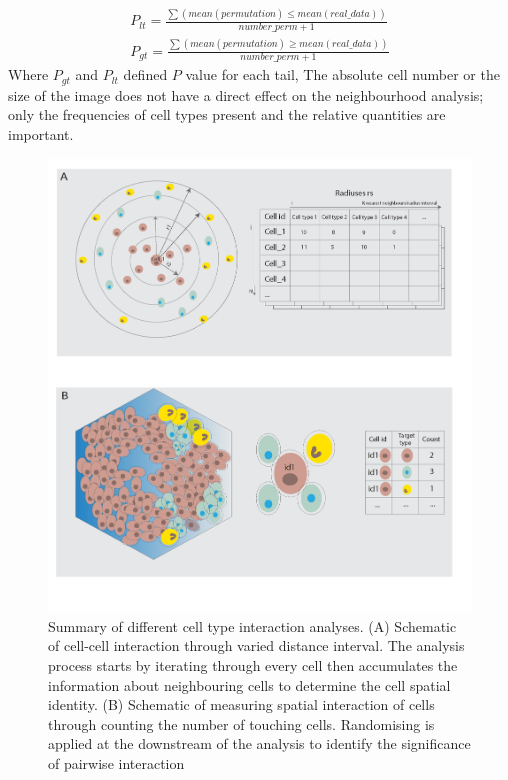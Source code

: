 \begin{equation}
\begin{split}
P_{lt} = \frac{ \sum(mean(permutation) \leq mean(real\_data) )}{number\_perm + 1} \\
P_{gt} = \frac{\sum(mean(permutation) \geq mean(real\_data) )}{number\_perm + 1}
\label{chap1:eq:02}
\end{split}
\end{equation}
Where $P_{gt}$ and $P_{lt}$ defined $P$ value for each tail, 
The absolute cell number or the size of the image does not have a direct effect on the neighbourhood analysis; only the frequencies of cell types present and the relative quantities are important. 
\begin{figure}
    \centering
    \includegraphics[width=0.85\columnwidth]{Chapter3/Figures/Conceptualise_CCC_analysis_cropped-01.png}
    \caption[Summary of different cell type interaction analyses.]{Summary of different cell type interaction analyses. (A) Schematic of cell-cell interaction through varied distance interval. The analysis process starts by iterating through every cell then accumulates the information about neighbouring cells to determine the cell spatial identity. (B) Schematic of measuring spatial interaction of cells through counting the number of touching cells. Randomising is applied at the downstream of the analysis to identify the significance of pairwise interaction}
    \label{fig:CCC_conceptualised}
\end{figure}

